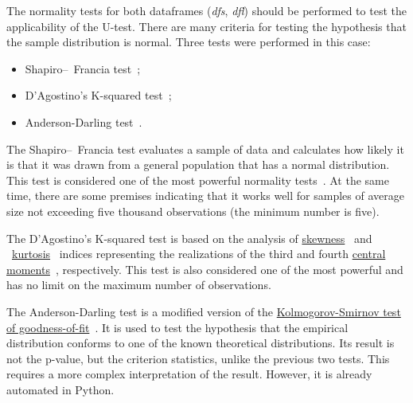 \documentclass[]{scrreprt}
\begin{document}
The normality tests for both dataframes (\textit{dfs}, \textit{dfl}) should be performed to test the applicability of the U-test. There are many criteria for testing the hypothesis that the sample distribution is normal. Three tests were performed in this case:
\begin{itemize}
	\item Shapiro--~Francia test~\cite{Shapiro-Wilk-test};
	\item D'Agostino's K-squared test~\cite{Agostino-test};
	\item Anderson-Darling test~\cite{Anderson-Darling-test}.
\end{itemize}
The Shapiro--~Francia test evaluates a sample of data and calculates how likely it is that it was drawn from a general population that has a normal distribution. This test is considered one of the most powerful normality tests~\cite{Kobzarq-prikl-mathstat}. At the same time, there are some premises indicating that it works well for samples of average size not exceeding five thousand observations (the minimum number is five).

The D'Agostino's K-squared test is based on the analysis of \href{https://en.wikipedia.org/wiki/Skewness}{skewness}~\cite{Wiki:skewness} and ~\href{https://en.wikipedia.org/wiki/Kurtosis}{kurtosis}~\cite{Wiki:kurtosis} indices representing the realizations of the third and fourth \href{https://en.wikipedia.org/wiki/Central_moment}{central moments}~\cite{Wiki:central-moment}, respectively. This test is also considered one of the most powerful and has no limit on the maximum number of observations.

The Anderson-Darling test is a modified version of the \href{https://en.wikipedia.org/wiki/Kolmogorov_Smirnov_test}{Kolmogorov-Smirnov test of goodness-of-fit}~\cite{Wiki:Kolmogorow-Smirnow-test}. It is used to test the hypothesis that the empirical distribution conforms to one of the known theoretical distributions. Its result is not the p-value, but the criterion statistics, unlike the previous two tests.  This requires a more complex interpretation of the result. However, it is already automated in Python.
\end{document}
